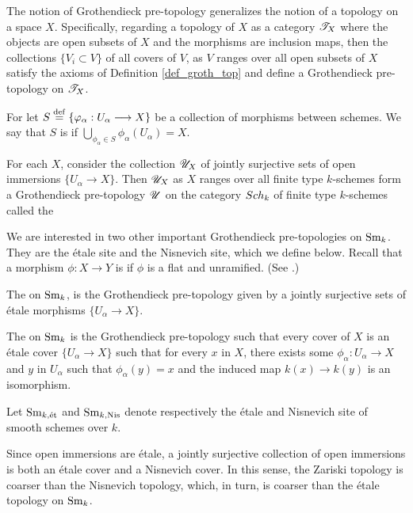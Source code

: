 \begin{rmk}
The notion of Grothendieck pre-topology generalizes the notion of a
topology on a space $X$. Specifically, regarding a topology of $X$ as
a category $\mathscr{T}_X$ where the objects are open subsets of $X$ and
the morphisms are inclusion maps, then the collections $\{V_i
\subset V\}$ of all covers of $V$, as $V$ ranges over all open 
subsets of $X$ satisfy the axioms of Definition \ref{def_groth_top} and 
define a Grothendieck pre-topology on $\mathscr{T}_X$.
\end{rmk}

\begin{defn}
For let $S \stackrel{\mathrm{def}}{=} \{\varphi_\alpha: U_\alpha \longrightarrow X\}$ be a collection 
of morphisms between schemes. We say that $S$ is  if $\bigcup_{\phi_\alpha \in S} \phi_\alpha(U_\alpha)
= X$.
\end{defn}

\begin{rmk}
For each $X$, consider the collection $\mathscr{U}_X$ of jointly 
surjective sets of open immersions $\{U_\alpha \to X\}$. Then
$\mathscr{U}_X$ as $X$ ranges over all finite type $k$-schemes 
form a Grothendieck pre-topology $\mathscr{U}$ on the category 
$Sch_k$ of finite type $k$-schemes called the 
\end{rmk}

We are interested in two other important Grothendieck 
pre-topologies on $\mathrm{Sm}_{k}$. They are the \'etale site and the 
Nisnevich site, which we define below. Recall that a morphism 
$\phi: X \to Y$ is  if $\phi$ is a flat and 
unramified. (See \cite[\S 1.3]{Milne}.)

\begin{defn}\label{def_sites}
  The  on $\mathrm{Sm}_{k}$, is the Grothendieck
  pre-topology given by a jointly surjective sets of \'etale morphisms
  $\{U_\alpha \to X\}.$

  The  on $\mathrm{Sm}_{k}$ is the Grothendieck
  pre-topology such that every cover of $X$ is an \'etale cover
  $\{U_\alpha \to X\}$ such that for every $x$ in $X$, there exists
  some $\phi_\alpha: U_\alpha \to X$ and $y$ in $U_\alpha$ such that
  $\phi_\alpha(y) = x$ and the induced map $k(x) \to k(y)$ is an
  isomorphism.

  Let $\mathrm{Sm}_{k,\mathrm{\acute{e}t}}$ and $\mathrm{Sm}_{k, \mathrm{Nis}}$ denote respectively the \'etale and
  Nisnevich site of smooth schemes over $k$.
\end{defn}

Since open immersions are \'etale, a jointly surjective collection 
of open immersions is both an \'etale cover and a Nisnevich cover. 
In this sense, the Zariski topology is coarser than the Nisnevich 
topology, which, in turn, is coarser than the \'etale topology
on $\mathrm{Sm}_{k}$.

